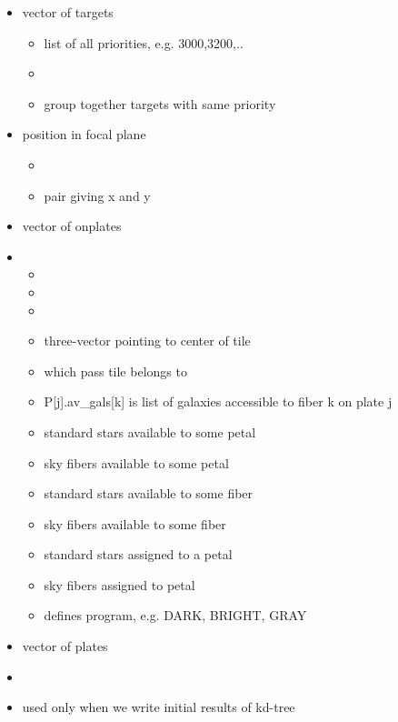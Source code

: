 \documentclass[12pt]{article}
\begin{document}
\begin{itemize}
\begin{itemize}
	\end{itemize}
\item{} vector of targets
	\begin{itemize}
	\item{} list of all priorities, e.g. 3000,3200,..
	\item{}
	\item{} group together targets with same priority
	\end{itemize}
\item{} position in focal plane 
	\begin{itemize}
		\item {}
		\item {} pair giving x and y
	\end{itemize}
\item{}  vector of onplates
\item{}
	\begin{itemize}	
		\item{}
		\item{}
		\item{}
		\item{} three-vector pointing to center of tile
		\item{} which pass tile belongs to
		\item{} P[j].av\_gals[k] is list of galaxies accessible to fiber k on plate j	
		\item{} standard stars available to some petal
		\item{}sky fibers available to some petal
		\item{}standard stars available to some fiber
		\item{}sky fibers available to some fiber	
		\item{} standard stars assigned to a petal
		\item{}sky fibers assigned to petal
		\item{} defines program, e.g. DARK, BRIGHT, GRAY
		
		
	\end{itemize}

\item{} vector of plates
\item{}
\item{} used only when we write initial results of kd-tree


\end{itemize}
\end{document}
